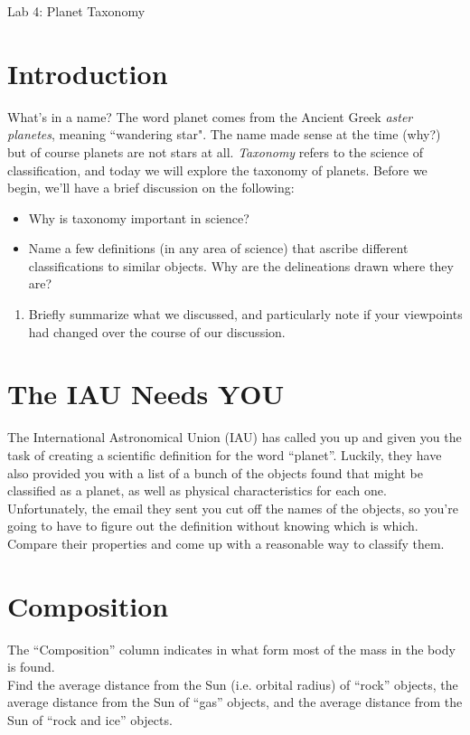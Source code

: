 \documentclass[12pt]{article}
\begin{document}
\thispagestyle{empty}
 \begin{center}
{\huge Lab 4: Planet Taxonomy}\\
\end{center} 


\section*{Introduction}

What's in a name? The word planet comes from the Ancient Greek \textit{aster planetes}, meaning ``wandering star". The name made sense at the time (why?) but of course planets are not stars at all. 
\textit{Taxonomy} refers to the science of classification, and today we will explore the taxonomy of planets. Before we begin, we'll have a brief discussion on the following:

\begin{itemize}
    \item{Why is taxonomy important in science?}
    \item{Name a few definitions (in any area of science) that ascribe different classifications to similar objects. Why are the delineations drawn where they are?}
\end{itemize}

\noindent
\begin{enumerate}
    \item Briefly summarize what we discussed, and particularly note if your viewpoints had
changed over the course of our discussion.
\end{enumerate}

\section*{The IAU Needs YOU}
The International Astronomical Union (IAU) has called you up and given you the task of creating a scientific definition for the word ``planet''. Luckily, they have also provided you with a list of a bunch of the objects found that might be classified as a planet, as well as physical characteristics for each one. Unfortunately, the email they sent you cut off the names of the objects, so you're going to have to figure out the definition without knowing which is which. Compare their properties and come up with a reasonable way to classify them.

\section*{Composition}
The ``Composition'' column indicates in what form most of the mass in the body is found.  
\linebreak
\\
Find the average distance from the Sun (i.e. orbital radius) of ``rock'' objects, the average distance from the Sun of ``gas'' objects, and the average distance from the Sun of ``rock and ice'' objects.
\end{document}
